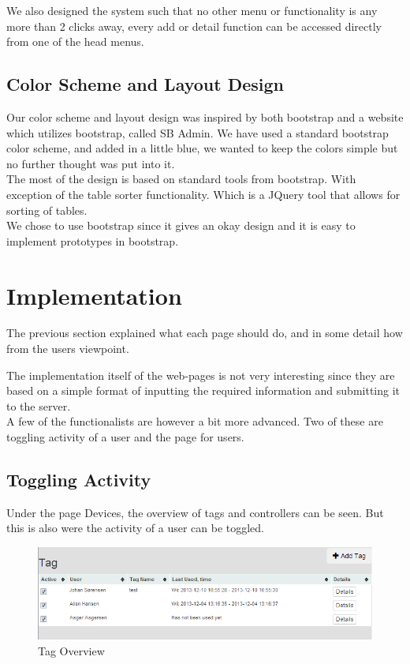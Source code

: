 We also designed the system such that no other menu or functionality is any more than 2 clicks away, every add or detail function can be accessed directly from one of the head menus.\\

\subsection{Color Scheme and Layout Design}
Our color scheme and layout design was inspired by both bootstrap and a website which utilizes bootstrap, called SB Admin\citep{sbadmin}. We have used a standard bootstrap color scheme, and added in a little blue, we wanted to keep the colors simple but no further thought was put into it.\\
The most of the design is based on standard tools from bootstrap. With exception of the table sorter functionality. Which is a JQuery tool that allows for sorting of tables.\\
We chose to use bootstrap since it gives an okay design and it is easy to implement prototypes in bootstrap.	


\section{Implementation}
The previous section explained what each page should do, and in some detail how from the users viewpoint.

The implementation itself of the web-pages is not very interesting since they are based on a simple format of inputting the required information and submitting it to the server.\\
A few of the functionalists are however a bit more advanced. Two of these are toggling activity of a user and the page for users.\\

\subsection{Toggling Activity}

Under the page Devices, the overview of tags and controllers can be seen. But this is also were the activity of a user can be toggled.

\begin{figure}[htbp]
	\centering
		\includegraphics[width=1.00\textwidth]{images/tagOverview.PNG}
	\caption{Tag Overview}
	\label{fig:tagOverview}
\end{figure}

